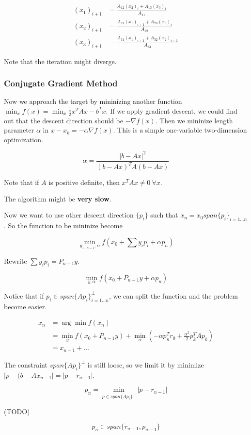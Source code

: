 \begin{align}
  (x_1)_{i+1} &= \frac{A_{12}(x_2)_i + A_{13}(x_3)_i}{A_{11}} \nonumber \\
  (x_2)_{i+1} &= \frac{A_{21}(x_1)_{i+1} + A_{23}(x_3)_i}{A_{22}} \nonumber \\
  (x_3)_{i+1} &= \frac{A_{31}(x_1)_{i+1} + A_{32}(x_2)_{i+1}}{A_{33}} \nonumber
\end{align}

Note that the iteration might diverge.

\subsubsection{Conjugate Gradient Method}

Now we approach the target by mininizing another
function $\min_x f(x) = \min_x \frac{1}{2}x^TAx - b^Tx$.
If we apply gradient descent, we could find out that
the descent direction should be $-\nabla f(x)$.
Then we mininize length parameter $\alpha$ in $x - x_k = - \alpha \nabla f(x)$.
This is a simple one-variable two-dimension optimization.

\[
  \alpha = \frac{|b-Ax|^2}{(b-Ax)^TA(b-Ax)}
\]

Note that if $A$ is positive definite, then $x^TAx \neq 0 \ \forall x$.

The algorithm might be \textbf{very slow}.

Now we want to use other descent direction $\{p_i\}$
such that $x_n = x_0 span\{p_i\}_{i=1 \dots n}$.
So the function to be mininize become

\[
  \min_{y_{1 \dots n-1}, \alpha} f(x_0 + \sum{y_ip_i}  + \alpha p_n)
\]

Rewrite $\sum{y_ip_i} = P_{n-1}y$.

\[
  \min_{y, \alpha} f(x_0 + P_{n-1}y + \alpha p_n)
\]

Notice that if $p_i \in span\{Ap_i\}_{i=1 \dots n}^\perp$,
we can split the function and the problem become easier.

\begin{align}
  x_n &= \arg\min f(x_n) \nonumber \\
      &= \min_y f(x_0 + P_{n-1}y) +
         \min_\alpha (-\alpha p_n^Tr_0 + \frac{\alpha^2}{2}p_k^TAp_k) \nonumber \\
      &= x_{n-1} + \dots \nonumber
\end{align}

The constraint $span\{Ap_i\}^\perp$ is still loose,
so we limit it by minimize $|p - (b - Ax_{n-1}| = |p - r_{n-1}|$.

\[
  p_n = \min_{p \in span\{Ap_{i}\}^\perp} |p - r_{n-1}|
\]

(TODO)

\[
  p_n \in span \{ r_{n-1}, p_{n-1}\}
\]
